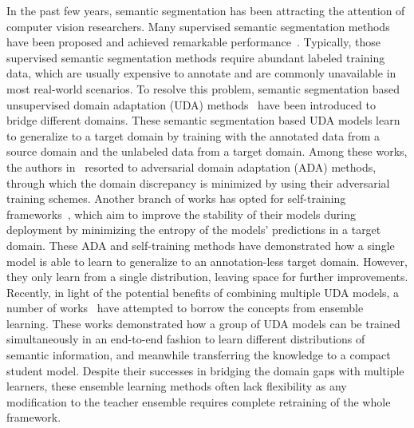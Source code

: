 \documentclass[final]{cvpr}
\begin{document}
\label{sec:introduction}
In the past few years, semantic segmentation has been attracting the attention of computer vision researchers. Many supervised semantic segmentation methods have been proposed and achieved remarkable performance~\cite{yu2017dilated, lin2017refinenet, yu2015multi, badrinarayanan2017segnet, long2015fully, yuan2019object, wu2019wider, sandler2018mobilenetv2, chen2014semantic, chen2017deeplab, chen2017rethinking, chen2018encoder, zhao2017pyramid}. Typically, those supervised semantic segmentation methods require abundant labeled training data, which are usually expensive to annotate and are commonly unavailable in most real-world scenarios. To resolve this problem, semantic segmentation based unsupervised domain adaptation (UDA) methods~\cite{hoffman2016fcns, hoffman2018cycada, luo2019significance, gong2019dlow, wu2018dcan, tsai2018learning, yang2020adversarial, tsai2019domain, vu2019advent, zhang2018fully, chen2017no, zheng2019unsupervised, choi2019self, zou2018unsupervised, zou2019confidence, zheng2020rectifying, tranheden2020dacs, luo2019taking, lee2018spigan, chen2019learning, vu2019dada, lv2020cross, yang2020fda} have been introduced to bridge different domains. These semantic segmentation based UDA models learn to generalize to a target domain by training with the annotated data from a source domain and the unlabeled data from a target domain. Among these works, the authors in~\cite{luo2019taking, hoffman2016fcns, hoffman2018cycada, luo2019significance, gong2019dlow, wu2018dcan, tsai2018learning, yang2020adversarial, tsai2019domain, vu2019advent, zhang2018fully, chen2017no, zheng2019unsupervised, chen2019crdoco, li2019bidirectional, du2019ssf} resorted to adversarial domain adaptation (ADA) methods, through which the domain discrepancy is minimized by using their adversarial training schemes. Another branch of works has opted for self-training frameworks~\cite{choi2019self, zou2018unsupervised, zou2019confidence, zheng2020rectifying, tranheden2020dacs}, which aim to improve the stability of their models during deployment by minimizing the entropy of the models' predictions in a target domain. These ADA and self-training methods have demonstrated how a single model is able to learn to generalize to an annotation-less target domain. However, they only learn from a single distribution, leaving space for further improvements. Recently, in light of the potential benefits of combining multiple UDA models, a number of works~\cite{nguyen2021unsupervised, kang2019contrastive} have attempted to borrow the concepts from ensemble learning. These works demonstrated how a group of UDA models can be trained simultaneously in an end-to-end fashion to learn different distributions of semantic information, and meanwhile transferring the knowledge to a compact student model. Despite their successes in bridging the domain gaps with multiple learners, these ensemble learning methods often lack flexibility as any modification to the teacher ensemble requires complete retraining of the whole framework.
\vspace{-0.2em}
\end{document}
